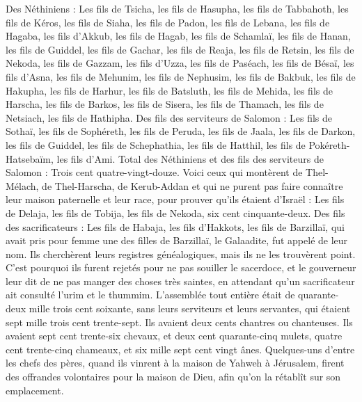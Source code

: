 \begin{multicols}{2}
Des Néthiniens : Les fils de Tsicha, les fils de Hasupha, les fils de Tabbahoth,
les fils de Kéros, les fils de Siaha, les fils de Padon,
les fils de Lebana, les fils de Hagaba, les fils d'Akkub,
les fils de Hagab, les fils de Schamlaï, les fils de Hanan,
les fils de Guiddel, les fils de Gachar, les fils de Reaja,
les fils de Retsin, les fils de Nekoda, les fils de Gazzam,
les fils d'Uzza, les fils de Paséach, les fils de Bésaï,
les fils d'Asna, les fils de Mehunim, les fils de Nephusim,
les fils de Bakbuk, les fils de Hakupha, les fils de Harhur,
les fils de Batsluth, les fils de Mehida, les fils de Harscha,
les fils de Barkos, les fils de Sisera, les fils de Thamach,
les fils de Netsiach, les fils de Hathipha.
Des fils des serviteurs de Salomon : Les fils de Sothaï, les fils de Sophéreth, les fils de Peruda,
les fils de Jaala, les fils de Darkon, les fils de Guiddel,
les fils de Schephathia, les fils de Hatthil, les fils de Pokéreth-Hatsebaïm, les fils d'Ami.
Total des Néthiniens et des fils des serviteurs de Salomon : Trois cent quatre-vingt-douze.
Voici ceux qui montèrent de Thel-Mélach, de Thel-Harscha, de Kerub-Addan et qui ne purent pas faire connaître leur maison paternelle et leur race, pour prouver qu’ils étaient d'Israël :
Les fils de Delaja, les fils de Tobija, les fils de Nekoda, six cent cinquante-deux.
Des fils des sacrificateurs : Les fils de Habaja, les fils d'Hakkots, les fils de Barzillaï, qui avait pris pour femme une des filles de Barzillaï, le Galaadite, fut appelé de leur nom.
Ils cherchèrent leurs registres généalogiques, mais ils ne les trouvèrent point. C'est pourquoi ils furent rejetés pour ne pas souiller le sacerdoce,
et le gouverneur leur dit de ne pas manger des choses très saintes, en attendant qu'un sacrificateur ait consulté l'urim et le thummim.
L’assemblée tout entière était de quarante-deux mille trois cent soixante,
sans leurs serviteurs et leurs servantes, qui étaient sept mille trois cent trente-sept. Ils avaient deux cents chantres ou chanteuses.
Ils avaient sept cent trente-six chevaux, et deux cent quarante-cinq mulets,
quatre cent trente-cinq chameaux, et six mille sept cent vingt ânes.
Quelques-uns d'entre les chefs des pères, quand ils vinrent à la maison de Yahweh à Jérusalem, firent des offrandes volontaires pour la maison de Dieu, afin qu'on la rétablît sur son emplacement.

\end{multicols}
